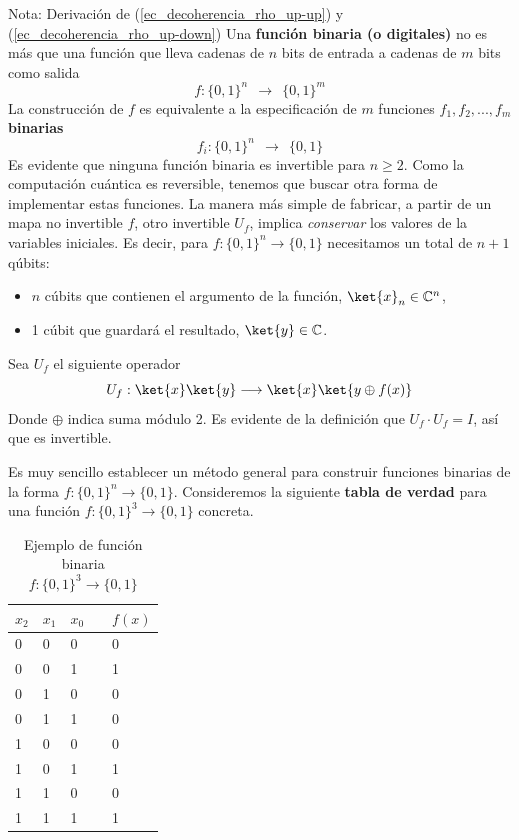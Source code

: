 \documentclass[a4paper,11pt]{book} %
\numberwithin{equation}{chapter}
\begin{document}
\begin{mybox_blue}{Nota: Derivación de (\ref{ec_decoherencia_rho_up-up}) y  (\ref{ec_decoherencia_rho_up-down})}
Una \textbf{función binaria (o digitales)} no es más que una función que lleva cadenas de $n$ bits de entrada a cadenas de $m$ bits como salida
$$
f : \{0,1\}^n ~~\to ~~\{0,1\}^m
$$
La construcción de $f$ es equivalente a la especificación de $m$ funciones  $f_1,f_2,...,f_m$ \textbf{binarias}
$$
f_i : \{0,1\}^n ~~\to ~~\{0,1\}
$$ 
Es evidente que ninguna función binaria es invertible para $n\geq 2$. Como la computación cuántica es reversible, tenemos que buscar otra forma de implementar estas funciones. La manera más simple de fabricar, a partir de un mapa no invertible $f$, otro invertible $U_f$, implica \textit{conservar} los valores de la variables iniciales. Es decir, para $f:\{0,1\}^n \to \{0,1\}$ necesitamos un total de $n+1$ qúbits:
\begin{itemize}
	\item $n$ cúbits que contienen el argumento de la función, $\ket{x}_n \in \mathbb{C}^n$, 
	\item 1 cúbit que guardará el resultado, $\ket{y} \in \mathbb{C}$.
\end{itemize}
Sea $U_f$ el siguiente operador
	\begin{equation} \label{ec_InicialOracle_Uf}
	U_f : \ket{x}\ket{y} \longrightarrow \ket{x} \ket{ y \oplus f(x) }
	\end{equation}
Donde $\oplus$ indica suma módulo 2. Es evidente de la definición que $U_f\cdot U_f = I$, así que es invertible.

Es muy sencillo establecer un método general para construir funciones binarias de la forma $f: \{0, 1\}^n \rightarrow \{0, 1\}$. Consideremos la siguiente \textbf{tabla de verdad} para una función $f: \{0, 1\}^3 \rightarrow \{0, 1\}$ concreta.

\begin{table}[H]
\centering
\begin{tabular}{lllll}
$x_2$ & $x_1$ & $x_0$ & & $f(x)$ \\ \hline
 0&0&0 &&0\\
 0&0&1 &&1\\
 0&1&0 &&0\\
 0&1&1 &&0\\
 1&0&0 &&0\\
 1&0&1 &&1\\
 1&1&0 &&0\\
 1&1&1 &&1\\ \hline
\end{tabular}
\caption{Ejemplo de función binaria $f: \{0, 1\}^3 \rightarrow \{0, 1\}$}
\label{Tab_InitialOracle_f_bin_1}
\end{table}


\end{mybox_blue}
\end{document}
